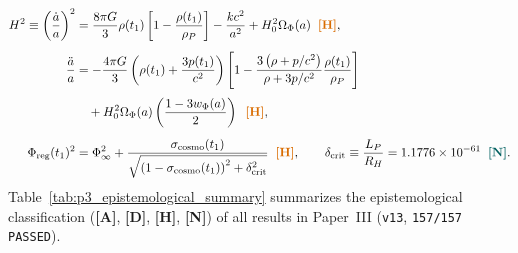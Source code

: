 \documentclass[11pt,a4paper]{article}
\newcommand{\catA}{\textbf{\textcolor{purple!80!black}{[A]}}}
\newcommand{\catD}{\textbf{\textcolor{blue!75!black}{[D]}}}
\newcommand{\catH}{\textbf{\textcolor{orange!85!black}{[H]}}}
\newcommand{\catN}{\textbf{\textcolor{teal!75!black}{[N]}}}
\theoremstyle{plain}
\theoremstyle{definition}
\theoremstyle{remark}
\numberwithin{equation}{section}
\begin{document}
\begin{subequations}
\label{eq:master_friedmann_jv}
\begin{align}
H^2 \equiv \left(\frac{\dot{a}}{a}\right)^2 &= \frac{8\pi G}{3} \rho(t_1) \left[ 1 - \frac{\rho(t_1)}{\rho_P} \right] - \frac{k c^2}{a^2} + H_0^2 \Omega_{\Phi}(a) \;\;\catH, \label{eq:friedmann_jv_first} \\[5pt]
\frac{\ddot{a}}{a} &= -\frac{4\pi G}{3} \left( \rho(t_1) + \frac{3 p(t_1)}{c^2} \right) \left[ 1 - \frac{3\left(\rho + p/c^2\right)}{\rho + 3p/c^2}\frac{\rho(t_1)}{\rho_P} \right] \nonumber \\[3pt]
&\quad + H_0^2 \Omega_{\Phi}(a)\left(\frac{1 - 3 w_{\Phi}(a)}{2}\right) \;\;\catH, \label{eq:friedmann_jv_second} \\[5pt]
\Phi_{\text{reg}}(t_1)^2 &= \Phi_{\infty}^2 + \frac{\sigma_{\text{cosmo}}(t_1)}{\sqrt{\left(1 - \sigma_{\text{cosmo}}(t_1)\right)^2 + \delta_{\text{crit}}^2}} \;\;\catH, \qquad \delta_{\text{crit}} \equiv \frac{L_P}{R_H} = 1.1776 \times 10^{-61} \;\;\catN. \label{eq:friedmann_jv_dilaton}
\end{align}
\end{subequations}
Table~\ref{tab:p3_epistemological_summary} summarizes the epistemological classification (\catA, \catD, \catH, \catN) of all results in Paper~III (\texttt{v13}, \texttt{157/157 PASSED}).
\end{document}
